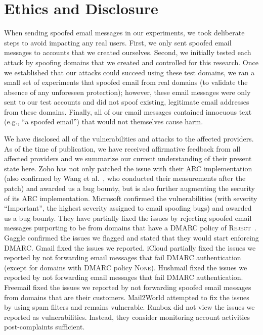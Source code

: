 \section{Ethics and Disclosure}
\label{sec:disclosure}
When sending spoofed email messages in our experiments,
we took deliberate steps to avoid impacting any real users.
First, we only sent spoofed email messages to accounts that we created ourselves.
Second, we initially tested each attack by spoofing domains that we created and controlled for this research.
Once we established that our attacks could succeed using these test domains,
we ran a small set of experiments that spoofed email from real domains (to validate the absence of any unforeseen protection);
however, these email messages were only sent to our test accounts and did not spoof existing, legitimate email addresses from these domains.
Finally, all of our email messages contained innocuous text (e.g., ``a spoofed email'') that would not themselves cause harm.

We have disclosed all of the vulnerabilities and attacks to the
affected providers. As of the time of publication, we have received
affirmative feedback from all affected providers and we summarize our
current understanding of their present state here. Zoho has not only
patched the issue with their ARC implementation (also confirmed by
Wang et al.~\cite{wang2022revisiting}, who conducted their
measurements after the patch) and awarded us a bug bounty, but is also
further augmenting the security of its ARC implementation. Microsoft
confirmed the vulnerabilities (with severity ``Important'', the
highest severity assigned to email spoofing bugs) and awarded us a bug
bounty. They have partially fixed the issues by rejecting spoofed email
messages purporting to be from domains that have a DMARC policy of
\textsc{Reject}~\cite{hotmailreject}.
Gaggle confirmed the issues we flagged and stated that they would
start enforcing DMARC. Gmail fixed the issues we reported.  iCloud
partially fixed the issues we reported by not forwarding email
messages that fail DMARC authentication (except for domains with DMARC
policy \textsc{None}). Hushmail fixed the issues we reported by not
forwarding email messages that fail DMARC authentication. Freemail
fixed the issues we reported by not forwarding spoofed email messages
from domains that are their customers. Mail2World attempted to fix the
issues by using spam filters and remains vulnerable. Runbox did not
view the issues we reported as vulnerabilities. Instead, they consider
monitoring account activities post-complaints sufficient.
